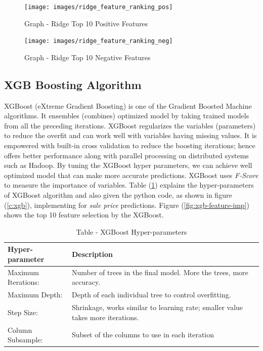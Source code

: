 \documentclass[sigconf]{acmart}
\begin{document}
	\begin{figure}[htb]
		\centering
		\texttt{[image: images/ridge\_feature\_ranking\_pos]}	
		\caption{Graph - Ridge Top 10 Positive Features} \label{fig:ridge-feature-ranking-pos} 
	\end{figure}

	\begin{figure}[htb]
		\centering
		\texttt{[image: images/ridge\_feature\_ranking\_neg]}	
		\caption{Graph - Ridge Top 10 Negative Features} \label{fig:ridge-feature-ranking-neg} 
	\end{figure}

	\subsection{XGB Boosting Algorithm}

	XGBoost (eXtreme Gradient Boosting) is one of the Gradient Boosted Machine algorithms. It ensembles (combines) optimized model by taking trained models from all the preceding iterations. XGBoost regularizes the variables (parameters) to reduce the overfit and can work well with variables having missing values. It is empowered with built-in cross validation to reduce the boosting iterations; hence offers better performance along with parallel processing on distributed systems such as Hadoop. By tuning the XGBoost hyper parameters, we can achieve well optimized model that can make more accurate predictions. XGBoost uses {\em F-Score} to measure the importance of  variables. Table (\ref{tab:xgb-param}) explains the hyper-parameters of XGBoost algorithm and also given the python code, as shown in figure (\ref{c:xgb}), implementing for {\em sale price} predictions. Figure (\ref{fig:xgb-feature-imp}) shows the top 10 feature selection by the XGBoost.
	
	\begin{table}[htb]
		\center
		\caption{Table - XGBoost Hyper-parameters}
		\label{tab:xgb-param}		
		\begin{tabular}{l p{5cm}}
			\toprule
			Hyper-parameter & Description \\
			\midrule
			Maximum Iterations: & Number of trees in the final model. More the trees, more accuracy. \\
			
			Maximum Depth: & Depth of each individual tree to control overfitting. \\
			
			Step Size: & Shrinkage, works similar to learning rate; smaller value takes more iterations. \\
			
			Column Subsample: & Subset of the columns to use in each iteration \\ 
			\bottomrule
		\end{tabular}
	\end{table}
	
\end{document}
